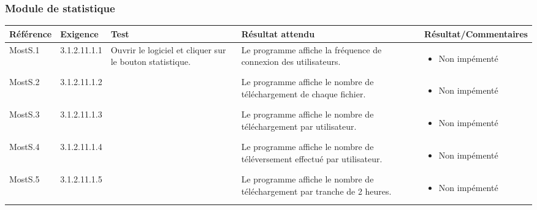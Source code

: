 \documentclass[10pt,a4paper,landscape]{report}
\begin{document}
\subsubsection{Module de statistique}
\begin{center}
	\bgroup
	\def\arraystretch{1.5}
	\begin{tabular}{|p{2.5cm}|p{2cm}|p{8cm}|p{8cm}|p{5cm}|}
		\hline
		\rowcolor{gris}Référence & Exigence & Test & Résultat attendu & Résultat/Commentaires\\
		\hline
		MostS.1 & 3.1.2.11.1.1 & Ouvrir le logiciel et cliquer sur le bouton statistique. & Le programme affiche la fréquence de connexion des utilisateurs. &\vspace*{-0.2cm} \begin{itemize}[label=$\ast$] \item \textcolor{false}{Non impémenté}\end{itemize}\\
		\cline{1-2}\cline{4-5}
		MostS.2 & 3.1.2.11.1.2 & & Le programme affiche le nombre de téléchargement de chaque fichier. &\vspace*{-0.2cm} \begin{itemize}[label=$\ast$] \item \textcolor{false}{Non impémenté}\end{itemize}
\\
		\cline{1-2}\cline{4-5}
		MostS.3 & 3.1.2.11.1.3 & & Le programme affiche le nombre de téléchargement par utilisateur. &\vspace*{-0.2cm} \begin{itemize}[label=$\ast$] \item \textcolor{false}{Non impémenté}\end{itemize}
\\
		\cline{1-2}\cline{4-5}
		MostS.4 & 3.1.2.11.1.4 & & Le programme affiche le nombre de téléversement effectué par utilisateur. &\vspace*{-0.2cm} \begin{itemize}[label=$\ast$] \item \textcolor{false}{Non impémenté}\end{itemize}
\\
		\cline{1-2}\cline{4-5}
		MostS.5 & 3.1.2.11.1.5 & & Le programme affiche le nombre de téléchargement par tranche de 2 heures. &\vspace*{-0.2cm} \begin{itemize}[label=$\ast$] \item \textcolor{false}{Non impémenté}\end{itemize}

\end{tabular}
\end{center}
\end{document}
